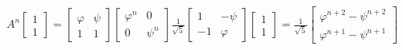 \documentclass[preview]{standalone}
\begin{document}
\begin{align*}
A^n\begin{bmatrix} 1 \\ 1 \end{bmatrix} = \begin{bmatrix} \varphi & \psi \\ 1 & 1 \end{bmatrix}\begin{bmatrix} \varphi^n & 0 \\ 0 & \psi^n \end{bmatrix}\frac{1}{\sqrt{5}}\begin{bmatrix} 1 & -\psi \\ -1 & \varphi \end{bmatrix}\begin{bmatrix} 1 \\ 1 \end{bmatrix} = \frac{1}{\sqrt{5}}\begin{bmatrix} \varphi^{n+2} - \psi^{n+2} \\ \varphi^{n+1} - \psi^{n+1} \end{bmatrix}
\end{align*}
\end{document}
